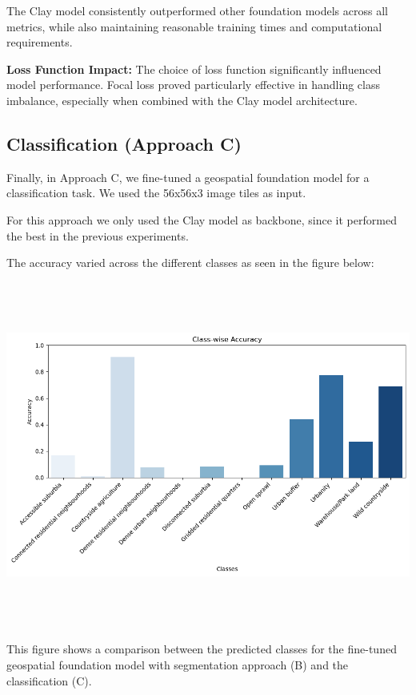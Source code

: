 \documentclass[
  letterpaper,
  DIV=11,
  numbers=noendperiod]{scrartcl}
\begin{document}
The Clay model consistently outperformed other foundation models across
all metrics, while also maintaining reasonable training times and
computational requirements.

\textbf{Loss Function Impact:} The choice of loss function significantly
influenced model performance. Focal loss proved particularly effective
in handling class imbalance, especially when combined with the Clay
model architecture.

\subsection{Classification (Approach
C)}\label{classification-approach-c}

Finally, in Approach C, we fine-tuned a geospatial foundation model for
a classification task. We used the 56x56x3 image tiles as input.

For this approach we only used the Clay model as backbone, since it
performed the best in the previous experiments.

The accuracy varied across the different classes as seen in the figure
below:

\begin{center}
\includegraphics[width=\textwidth,height=4.47917in]{../figures/algo_design/class_acc.png}
\end{center}

This figure shows a comparison between the predicted classes for the
fine-tuned geospatial foundation model with segmentation approach (B)
and the classification (C).
\end{document}
